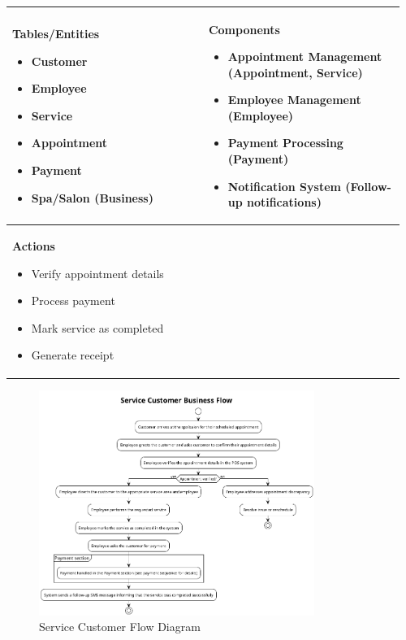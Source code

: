 \documentclass[]{VUMIFTemplateClass}
\newenvironment{mpitemlist}[1][\linewidth]{%
    \begin{minipage}[t]{#1}%
        \setlength{\leftmargini}{12pt}%
        \begin{itemize}%
            \setlength{\itemsep}{1pt}%
            \setlength{\parskip}{0pt}%
            \setlength{\parsep}{0pt}%
}{%
        \end{itemize}%
    \end{minipage}\newline
}
\begin{document}
\begin{center}
\setlength{\tabcolsep}{8pt}
\begin{tabular}{|p{0.48\linewidth}|p{0.48\linewidth}|}
\hline
\textbf{Tables/Entities} \newline
\begin{mpitemlist}
\item Customer
\item Employee
\item Service
\item Appointment
\item Payment
\item Spa/Salon (Business)
\end{mpitemlist}
&
\textbf{Components} \newline
\begin{mpitemlist}
\item Appointment Management (Appointment, Service)
\item Employee Management (Employee)
\item Payment Processing (Payment)
\item Notification System (Follow-up notifications)
\end{mpitemlist}
\\ \hline
\textbf{Actions} \newline
\begin{mpitemlist}
\item Verify appointment details
\item Process payment
\item Mark service as completed
\item Generate receipt
\end{mpitemlist}
&

\\ \hline
\end{tabular}
\end{center}

\begin{figure}[H]
    \centering
    \includegraphics[width=0.8\textwidth]{images/diagrams/services/service_customer_flow.png}
    \caption{Service Customer Flow Diagram}
    \label{fig:service_customer_flow}
\end{figure}
\end{document}
